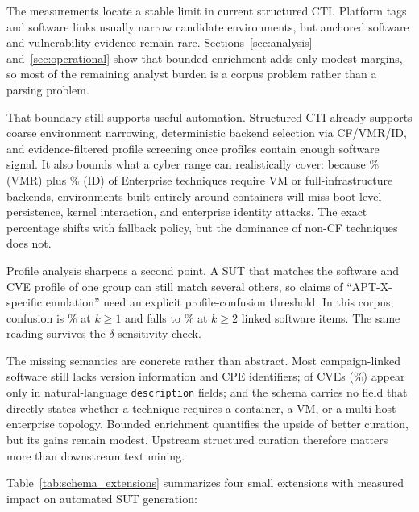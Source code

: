 \documentclass[sigconf]{acmart}
\begin{document}
The measurements locate a stable limit in current structured CTI. Platform tags and software links usually narrow candidate environments, but anchored software and vulnerability evidence remain rare. Sections~\ref{sec:analysis} and~\ref{sec:operational} show that bounded enrichment adds only modest margins, so most of the remaining analyst burden is a corpus problem rather than a parsing problem.

That boundary still supports useful automation. Structured CTI already supports coarse environment narrowing, deterministic backend selection via CF/VMR/ID, and evidence-filtered profile screening once profiles contain enough software signal. It also bounds what a cyber range can realistically cover: because \compatibilityvmrequiredpercentage\% (VMR) plus \compatibilityinfrastructuredependentpercentage\% (ID) of Enterprise techniques require VM or full-infrastructure backends, environments built entirely around containers will miss boot-level persistence, kernel interaction, and enterprise identity attacks. The exact percentage shifts with fallback policy, but the dominance of non-CF techniques does not.

Profile analysis sharpens a second point. A SUT that matches the software and CVE profile of one group can still match several others, so claims of ``APT-X-specific emulation'' need an explicit profile-confusion threshold. In this corpus, confusion is \thresholdkoneconfusionpct\% at $k \geq 1$ and falls to \thresholdktwoconfusionpct\% at $k \geq 2$ linked software items. The same reading survives the $\delta$ sensitivity check.

The missing semantics are concrete rather than abstract. Most campaign-linked software still lacks version information and CPE identifiers; \cvefreetextonlycount{} of \cveuniquecount{} CVEs (\cvefromfreetextpct\%) appear only in natural-language \texttt{description} fields; and the schema carries no field that directly states whether a technique requires a container, a VM, or a multi-host enterprise topology. Bounded enrichment quantifies the upside of better curation, but its gains remain modest. Upstream structured curation therefore matters more than downstream text mining.

Table~\ref{tab:schema_extensions} summarizes four small extensions with measured impact on automated SUT generation:
\end{document}
